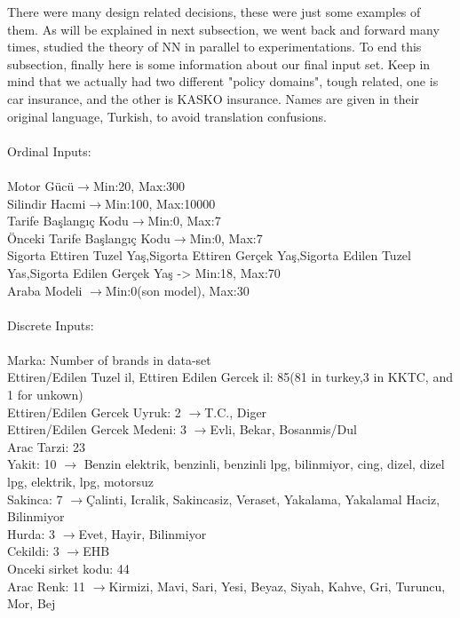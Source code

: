 \documentclass[titlepage, a4paper, 14pt]{extarticle} %
\begin{document}
There were many design related decisions, these were just some examples of them. As will be explained in next subsection, we went back and forward many times, studied the theory of NN in parallel to experimentations. To end this subsection, finally here is some information about our final input set. Keep in mind that we actually had two different "policy domains", tough related, one is car insurance, and the other is KASKO insurance. Names are given in their original language, Turkish, to avoid translation confusions. \\\\
Ordinal Inputs:\\\\
Motor Gücü$\rightarrow$Min:20, Max:300\\
Silindir Hacmi$\rightarrow$Min:100, Max:10000\\
Tarife Başlangıç Kodu$\rightarrow$Min:0, Max:7\\
Önceki Tarife Başlangıç Kodu$\rightarrow$Min:0, Max:7\\
Sigorta Ettiren Tuzel Yaş,Sigorta Ettiren Gerçek Yaş,Sigorta Edilen Tuzel Yas,Sigorta Edilen Gerçek Yaş -> Min:18, Max:70\\
Araba Modeli $\rightarrow$Min:0(son model), Max:30\\\\
Discrete Inputs:\\\\
Marka: Number of brands in data-set\\
Ettiren/Edilen Tuzel il, Ettiren Edilen Gercek il: 85(81 in turkey,3 in KKTC, and 1 for unkown)\\
Ettiren/Edilen Gercek Uyruk: 2 $\rightarrow$T.C., Diger\\
Ettiren/Edilen Gercek Medeni: 3 $\rightarrow$Evli, Bekar, Bosanmis/Dul\\
Arac Tarzi: 23\\
Yakit: 10 $\rightarrow$ Benzin elektrik, benzinli, benzinli lpg, bilinmiyor, cing, dizel, dizel  lpg, elektrik, lpg, motorsuz\\
Sakinca: 7 $\rightarrow$Çalinti, Icralik, Sakincasiz, Veraset, Yakalama, Yakalamal Haciz, Bilinmiyor\\
Hurda: 3 $\rightarrow$Evet, Hayir, Bilinmiyor\\
Cekildi: 3 $\rightarrow$EHB\\
Onceki sirket kodu: 44\\
Arac Renk: 11 $\rightarrow$Kirmizi, Mavi, Sari, Yesi, Beyaz, Siyah, Kahve, Gri, Turuncu, Mor, Bej\\
\end{document}
